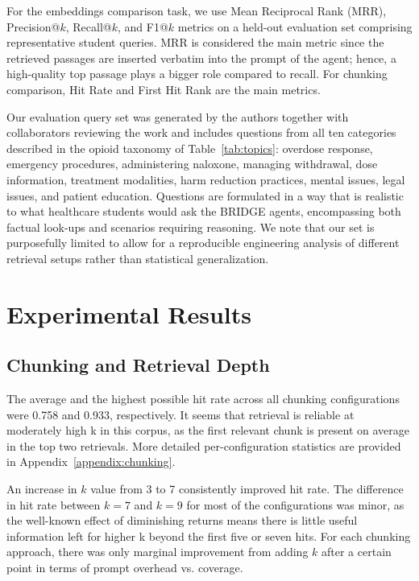 \documentclass[pdflatex,sn-mathphys-num]{sn-jnl}
\theoremstyle{thmstyleone}
\theoremstyle{thmstyletwo}
\theoremstyle{thmstylethree}
\begin{document}
For the embeddings comparison task, we use Mean Reciprocal Rank (MRR), Precision@$k$, Recall@$k$, and F1@$k$ metrics on a held-out evaluation set comprising representative student queries. MRR is considered the main metric since the retrieved passages are inserted verbatim into the prompt of the agent; hence, a high-quality top passage plays a bigger role compared to recall. For chunking comparison, Hit Rate and First Hit Rank are the main metrics.

Our evaluation query set was generated by the authors together with collaborators reviewing the work and includes questions from all ten categories described in the opioid taxonomy of Table~\ref{tab:topics}: overdose response, emergency procedures, administering naloxone, managing withdrawal, dose information, treatment modalities, harm reduction practices, mental issues, legal issues, and patient education. Questions are formulated in a way that is realistic to what healthcare students would ask the BRIDGE agents, encompassing both factual look-ups and scenarios requiring reasoning. We note that our set is purposefully limited to allow for a reproducible engineering analysis of different retrieval setups rather than statistical generalization.

\section{Experimental Results}\label{sec:results}

\subsection{Chunking and Retrieval Depth}

The average and the highest possible hit rate across all chunking configurations were 0.758 and 0.933, respectively. It seems that retrieval is reliable at moderately high k in this corpus, as the first relevant chunk is present on average in the top two retrievals. More detailed per-configuration statistics are provided in Appendix~\ref{appendix:chunking}.

An increase in $k$ value from 3 to 7 consistently improved hit rate. The difference in hit rate between $k=7$ and $k=9$ for most of the configurations was minor, as the well-known effect of diminishing returns means there is little useful information left for higher k beyond the first five or seven hits. For each chunking approach, there was only marginal improvement from adding $k$ after a certain point in terms of prompt overhead vs. coverage.
\end{document}
